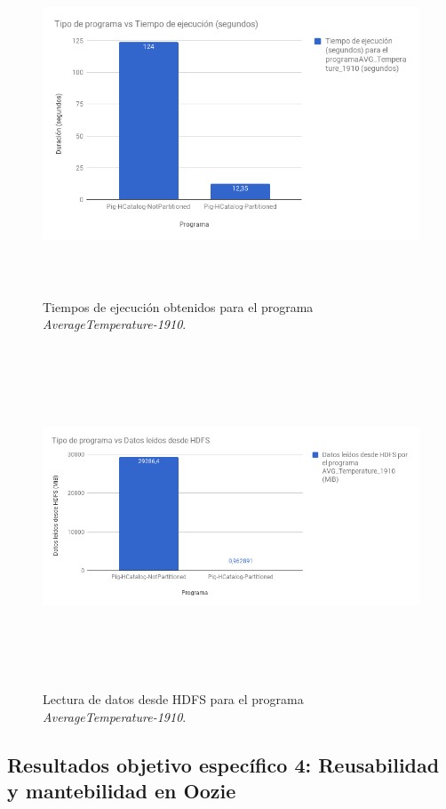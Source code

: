 \begin{figure}[H]
  \centering
      \includegraphics[width=\textwidth, height=4.0in]{fig/07/03_03}
  \caption{Tiempos de ejecución obtenidos para el programa \textit{AverageTemperature-1910}.}
  \label{07_03_03}
\end{figure}

\begin{figure}[H]
  \centering
      \includegraphics[width=\textwidth, height=4.0in]{fig/07/03_04}
  \caption{Lectura de datos desde HDFS para el programa \textit{AverageTemperature-1910}.}
  \label{07_03_04}
\end{figure}

\subsection{Resultados objetivo específico 4: Reusabilidad y mantebilidad en Oozie}

